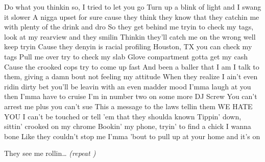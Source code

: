 \beginverse
Do what you thinkin so, I tried to let you go
Turn up a blink of light and I swang it slower
A nigga upset for sure cause they think they know that they catchin me with plenty of the drink and dro
So they get behind me tryin to check my tags, look at my rearview and they smilin
Thinkin they'll catch me on the wrong well keep tryin
Cause they denyin is racial profiling
Houston, TX you can check my tags
Pull me over try to check my slab
Glove compartment gotta get my cash
Cause the crooked cops try to come up fast
And been a baller that I am I talk to them, giving a damn bout not feeling my attitude
When they realize I ain't even ridin dirty bet you'll be leavin with an even madder mood
I'mma laugh at you then I'mma have to cruise I'm in number two on some more DJ Screw
You can't arrest me plus you can't sue
This a message to the laws tellin them WE HATE YOU
I can't be touched or tell 'em that they shoulda known
Tippin' down, sittin' crooked on my chrome
Bookin' my phone, tryin' to find a chick I wanna bone
Like they couldn't stop me I'mma 'bout to pull up at your home and it's on
\endverse

\beginchorus
They see me rollin\dots
\textit{(repeat )}
\endchorus
\endsong

